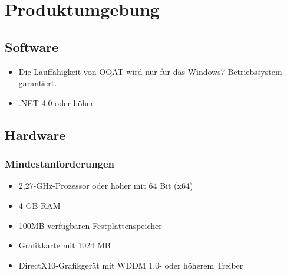 \chapter{Produktumgebung}

\section{Software}
\begin{itemize}
\item Die Lauffähigkeit von \gls{OQAT} wird nur für das Windows7 Betriebssystem garantiert.
\item .NET 4.0 oder höher
\end{itemize}
\section{Hardware}
\subsection{Mindestanforderungen}
\begin{itemize}
\item 2,27-GHz-Prozessor oder höher mit 64 Bit (x64)
\item 4 GB RAM
\item 100MB verfügbaren Festplattenspeicher
\item Grafikkarte mit 1024 MB
\item DirectX10-Grafikgerät mit WDDM 1.0- oder höherem Treiber
\end{itemize}
